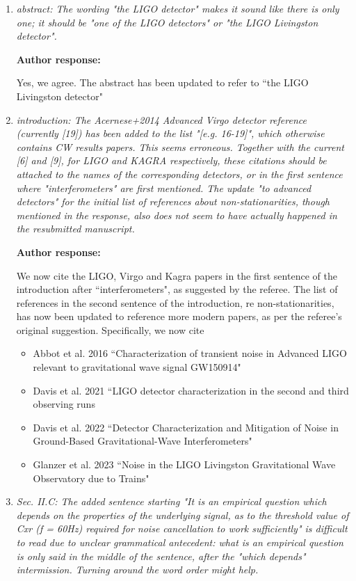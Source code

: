 \documentclass[10pt]{article}
\begin{document}
\begin{enumerate}
	
	\item \textit{abstract: The wording "the LIGO detector" makes it sound like there is only
	one; it should be "one of the LIGO detectors" or "the LIGO Livingston detector".}

	\textbf{Author response:} 

Yes, we agree. The abstract has been updated to refer to ``the LIGO Livingston detector"
	
	\item  \textit{introduction: The Acernese+2014 Advanced Virgo detector reference (currently
	[19]) has been added to the list "[e.g. 16-19]", which otherwise contains CW
	results papers. This seems erroneous. Together with the current [6] and [9], for
	LIGO and KAGRA respectively, these citations should be attached to the names of
	the corresponding detectors, or in the first sentence where "interferometers"
	are first mentioned. The update "to advanced detectors" for the initial list of
	references about non-stationarities, though mentioned in the response, also does
	not seem to have actually happened in the resubmitted manuscript.}

	\textbf{Author response:} 
	
	We now cite the LIGO, Virgo and Kagra papers in the first sentence of the introduction after ``interferometers", as suggested by the referee. The list of references in the second sentence of the introduction, re non-stationarities, has now been updated to reference more modern papers, as per the referee's original suggestion. Specifically, we now cite
	\begin{itemize} 
		\item Abbot et al. 2016 ``Characterization of transient noise in Advanced LIGO relevant to gravitational wave signal GW150914"
		\item Davis et al. 2021 ``LIGO detector characterization in the second and third observing runs
		\item Davis et al. 2022 ``Detector Characterization and Mitigation of Noise in Ground-Based Gravitational-Wave Interferometers"
		\item Glanzer et al. 2023 ``Noise in the LIGO Livingston Gravitational Wave Observatory due to Trains"
	\end{itemize} 
	
	
	
	
	
	\item \textit{Sec. II.C: The added sentence starting "It is an empirical question which depends on the properties of the underlying signal, as to the threshold value of Cxr (f = 60Hz) required for noise cancellation to work sufficiently" is difficult to read due to unclear grammatical antecedent: what is an empirical question is only said in the middle of the sentence, after the "which depends" intermission. Turning around the word order might help.}
	

\end{enumerate}
\end{document}
